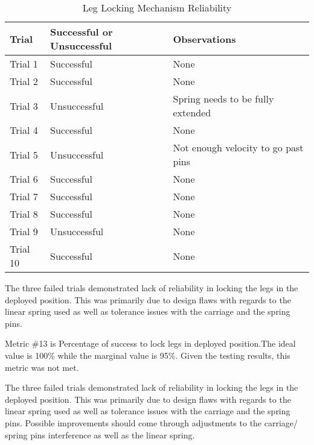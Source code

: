 \begin{table}[H]
\centering
\caption{Leg Locking Mechanism Reliability}
\label{table:leglockingreliability}
\begin{tabular}{|
>{\raggedright\arraybackslash}p{}|
>{\raggedright\arraybackslash}p{}|
>{\raggedright\arraybackslash}p{}|
}
    \hline
     \textbf{Trial} & \textbf{Successful or Unsuccessful } & \textbf{Observations}
    \\\hline 
     Trial 1 & Successful & {None}
     \\\hline 
     Trial 2 & Successful & {None}
     \\\hline
     Trial 3 & Unsuccessful & {Spring needs to be fully extended}
     \\\hline
    Trial 4 & Successful & {None}
     \\\hline
    Trial 5 & Unsuccessful & {Not enough velocity to go past pins}
    \\\hline
    Trial 6 & Successful & {None}
    \\\hline
    Trial 7 & Successful & {None}
    \\\hline
    Trial 8 & Successful & {None}
    \\\hline
    Trial 9 & Unsuccessful & {None}
    \\\hline
    Trial 10 & Successful & {None}
    \\\hline
\end{tabular}
\end{table}

The three failed trials demonstrated lack of reliability in locking the legs in the deployed position. This was primarily due to design flaws with regards to the linear spring used as well as tolerance issues with the carriage and the spring pins. 

Metric \#13 is Percentage of success to lock legs in deployed position.The ideal value is 100\% while the marginal value is 95\%. Given the testing results, this metric was not met.

The three failed trials demonstrated lack of reliability in locking the legs in the deployed position. This was primarily due to design flaws with regards to the linear spring used as well as tolerance issues with the carriage and the spring pins. Possible improvements should come through adjustments to the carriage/ spring pins interference as well as the linear spring.